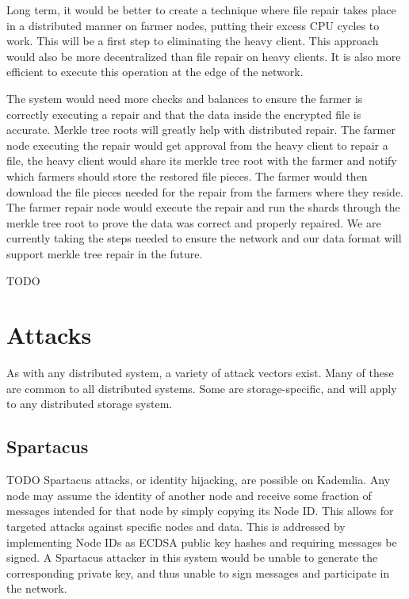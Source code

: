 \documentclass[a4paper,10pt]{article} \usepackage[utf8]{inputenc}
\newcommand{\todo}[1]{{\color{red} TODO #1 }}
\begin{document}
Long term, it would be better to create a technique where file repair takes
place in a distributed manner on farmer nodes, putting their excess CPU cycles
to work. This will be a first step to eliminating the heavy client. This
approach would also be more decentralized than file repair on heavy clients. It
is also more efficient to execute this operation at the edge of the network.

The system would need more checks and balances to ensure the farmer is correctly
executing a repair and that the data inside the encrypted file is accurate.
Merkle tree roots will greatly help with distributed repair. The farmer node
executing the repair would get approval from the heavy client to repair a file,
the heavy client would share its merkle tree root with the farmer and notify
which farmers should store the restored file pieces. The farmer would then
download the file pieces needed for the repair from the farmers where they
reside. The farmer repair node would execute the repair and run the shards
through the merkle tree root to prove the data was correct and properly
repaired. We are currently taking the steps needed to ensure the network and our
data format will support merkle tree repair in the future.

\todo{}

\newpage \appendix

\section{Attacks}

As with any distributed system, a variety of attack vectors exist. Many of these
are common to all distributed systems. Some are storage-specific, and will apply
to any distributed storage system.

\subsection{Spartacus}

\todo{ Spartacus attacks, or identity hijacking, are possible on Kademlia. Any
node may assume the identity of another node and receive some fraction of
messages intended for that node by simply copying its Node ID. This allows for
targeted attacks against specific nodes and data. This is addressed by
implementing Node IDs as ECDSA public key hashes and requiring messages be
signed. A Spartacus attacker in this system would be unable to generate the
corresponding private key, and thus unable to sign messages and participate in
the network. }
\end{document}
